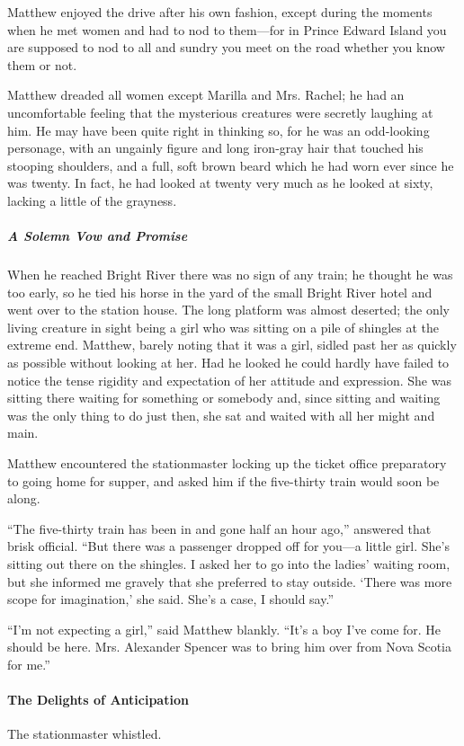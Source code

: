 \documentclass{article}
\begin{document}
Matthew enjoyed the drive after his own fashion, except during the moments when he met women and had to nod to them---for in Prince Edward Island you are supposed to nod to all and sundry you meet on the road whether you know them or not.

Matthew dreaded all women except Marilla and Mrs. Rachel; he had an uncomfortable feeling that the mysterious creatures were secretly laughing at him. He may have been quite right in thinking so, for he was an odd-looking personage, with an ungainly figure and long iron-gray hair that touched his stooping shoulders, and a full, soft brown beard which he had worn ever since he was twenty. In fact, he had looked at twenty very much as he looked at sixty, lacking a little of the grayness.

\subparagraph{A Solemn Vow and Promise}
When he reached Bright River there was no sign of any train; he thought he was too early, so he tied his horse in the yard of the small Bright River hotel and went over to the station house. The long platform was almost deserted; the only living creature in sight being a girl who was sitting on a pile of shingles at the extreme end. Matthew, barely noting that it was a girl, sidled past her as quickly as possible without looking at her. Had he looked he could hardly have failed to notice the tense rigidity and expectation of her attitude and expression. She was sitting there waiting for something or somebody and, since sitting and waiting was the only thing to do just then, she sat and waited with all her might and main.

Matthew encountered the stationmaster locking up the ticket office preparatory to going home for supper, and asked him if the five-thirty train would soon be along.

``The five-thirty train has been in and gone half an hour ago,'' answered that brisk official. ``But there was a passenger dropped off for you---a little girl. She's sitting out there on the shingles. I asked her to go into the ladies' waiting room, but she informed me gravely that she preferred to stay outside. `There was more scope for imagination,' she said. She's a case, I should say.''

``I'm not expecting a girl,'' said Matthew blankly. ``It's a boy I've come for. He should be here. Mrs. Alexander Spencer was to bring him over from Nova Scotia for me.''

\paragraph{The Delights of Anticipation}
The stationmaster whistled.
\end{document}
